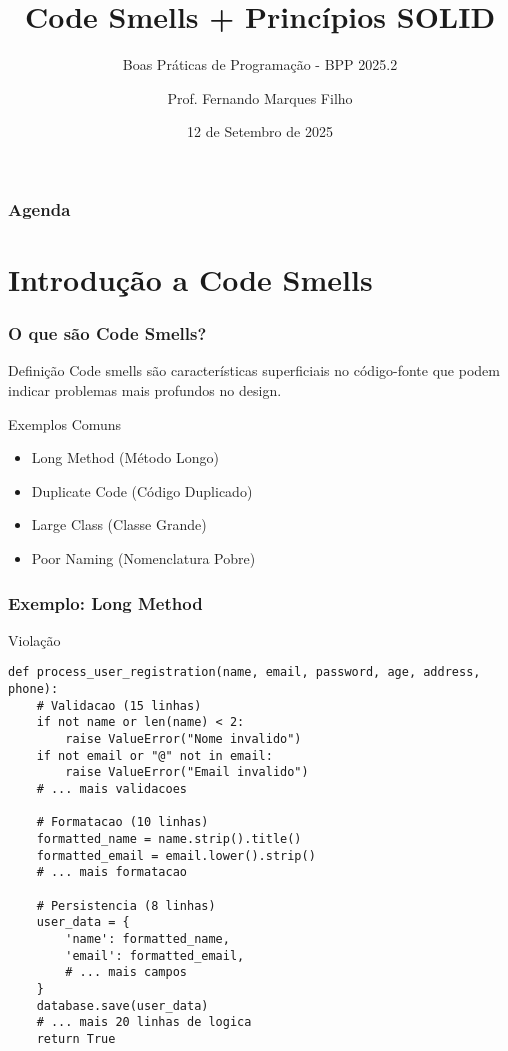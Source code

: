 \documentclass[aspectratio=169]{beamer}
\title{Code Smells + Princípios SOLID}
\subtitle{Boas Práticas de Programação - BPP 2025.2}
\author{Prof. Fernando Marques Filho}
\institute{Universidade Federal do Rio Grande do Norte}
\date{12 de Setembro de 2025}
\begin{document}
\frame{\titlepage}

\begin{frame}
\frametitle{Agenda}
\tableofcontents
\end{frame}

\section{Introdução a Code Smells}

\begin{frame}
\frametitle{O que são Code Smells?}
\begin{center}
\end{center}

\vspace{0.5cm}
\begin{block}{Definição}
\footnotesize
Code smells são características superficiais no código-fonte que podem indicar problemas mais profundos no design.
\end{block}

\begin{exampleblock}{Exemplos Comuns}
\footnotesize
\begin{itemize}
    \item Long Method (Método Longo)
    \item Duplicate Code (Código Duplicado)
    \item Large Class (Classe Grande)
    \item Poor Naming (Nomenclatura Pobre)
\end{itemize}
\end{exampleblock}
\end{frame}

\begin{frame}[fragile]
\frametitle{Exemplo: Long Method}
\begin{block}{\textcolor{cleanred}{\faTimes} Violação}
\scriptsize
\begin{lstlisting}
def process_user_registration(name, email, password, age, address, phone):
    # Validacao (15 linhas)
    if not name or len(name) < 2:
        raise ValueError("Nome invalido")
    if not email or "@" not in email:
        raise ValueError("Email invalido")
    # ... mais validacoes
    
    # Formatacao (10 linhas)
    formatted_name = name.strip().title()
    formatted_email = email.lower().strip()
    # ... mais formatacao
    
    # Persistencia (8 linhas)
    user_data = {
        'name': formatted_name,
        'email': formatted_email,
        # ... mais campos
    }
    database.save(user_data)
    # ... mais 20 linhas de logica
    return True
\end{lstlisting}
\end{block}
\end{frame}
\end{document}
